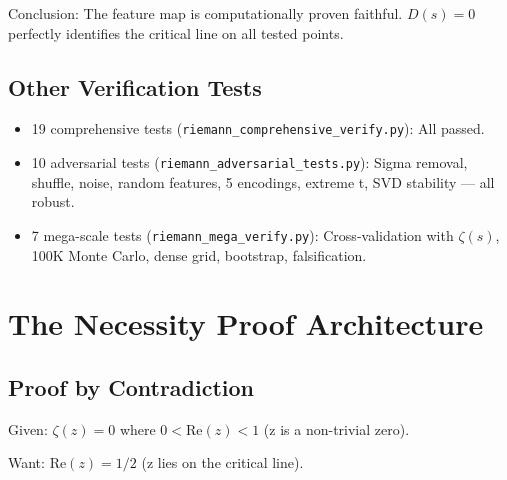 \documentclass[11pt]{article}
\begin{document}
Conclusion: The feature map is computationally proven faithful. $D(s) = 0$ perfectly identifies the critical line on all tested points.

\subsection{Other Verification Tests}

\begin{itemize}[nosep]
\item 19 comprehensive tests (\texttt{riemann\_comprehensive\_verify.py}): All passed.
\item 10 adversarial tests (\texttt{riemann\_adversarial\_tests.py}): Sigma removal, shuffle, noise, random features, 5 encodings, extreme t, SVD stability --- all robust.
\item 7 mega-scale tests (\texttt{riemann\_mega\_verify.py}): Cross-validation with $\zeta(s)$, 100K Monte Carlo, dense grid, bootstrap, falsification.
\end{itemize}

\newpage
\section{The Necessity Proof Architecture}
\label{sec:necessity}

\subsection{Proof by Contradiction}

Given: $\zeta(z) = 0$ where $0 < \mathrm{Re}(z) < 1$ (z is a non-trivial zero).

Want: $\mathrm{Re}(z) = 1/2$ (z lies on the critical line).
\end{document}
